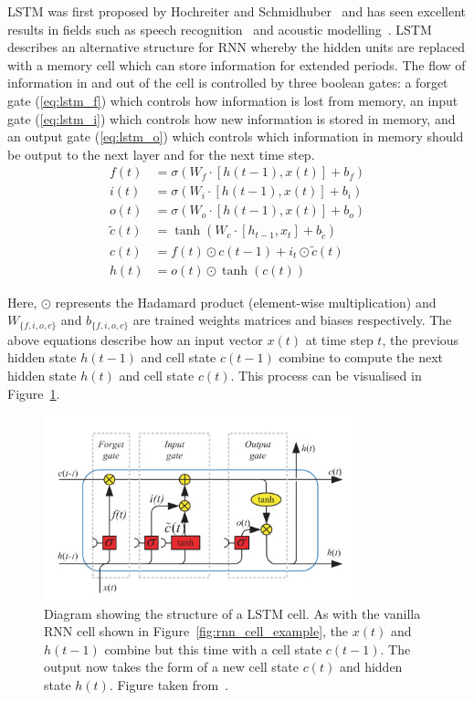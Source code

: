 LSTM was first proposed by Hochreiter and Schmidhuber~\cite{hochreiter1997long}
and has seen excellent results in fields such as speech
recognition~\cite{he2016exploiting} and acoustic
modelling~\cite{qu2017syllable}. LSTM describes an alternative structure for RNN
whereby the hidden units are replaced with a memory cell which can store
information for extended periods. The flow of information in and out of
the cell is controlled by three boolean gates: a forget gate (\ref{eq:lstm_f})
which controls how information is lost from memory, an
input gate (\ref{eq:lstm_i}) which controls how new information is stored in
memory, and an output gate (\ref{eq:lstm_o}) which controls which information in
memory should be output to the next layer and for the next time step.
\begin{align}
  f(t) &= \sigma(W_f \cdot \left[ h(t-1),x(t) \right] + b_f) \label{eq:lstm_f} \\[0.5em]
  i(t) &= \sigma(W_i \cdot \left[ h(t-1),x(t) \right] + b_i) \label{eq:lstm_i} \\[0.5em]
  o(t) &= \sigma(W_o \cdot \left[ h(t-1),x(t) \right] + b_o) \label{eq:lstm_o} \\[0.5em]
  \tilde{c}(t) &= \tanh \left( 
    W_c \cdot \left[ h_{t-1},x_t \right] + b_{\tilde{c}}
  \right)\\[0.5em]
  c(t) &= f(t) \odot c(t-1) + i_t \odot \tilde{c}(t) \\[0.5em]
  h(t) &= o(t) \odot \tanh (c(t))
\end{align}

Here, $\odot$ represents the Hadamard product (element-wise multiplication) and
$W_{\{f,i,o,c\}}$ and $b_{\{f,i,o,c\}}$ are trained weights matrices and biases
respectively. The above equations describe how an input vector $x(t)$ at time
step $t$, the previous hidden state $h(t-1)$ and cell state $c(t-1)$ combine to
compute the next hidden state $h(t)$ and cell state $c(t)$. This process can be
visualised in Figure~\ref{fig:lstm_cell_example}.

\begin{figure}[ht]
  \centering
  \includegraphics[width=0.8\textwidth]{figures/lstm_cell.png}
  \caption{Diagram showing the structure of a LSTM cell. As with the vanilla RNN
    cell shown in Figure~\ref{fig:rnn_cell_example}, the $x(t)$ and $h(t-1)$
    combine but this time with a cell state $c(t-1)$. The output now takes the
    form of a new cell state $c(t)$ and hidden state $h(t)$. Figure taken
  from~\cite{yu2019review}.}\label{fig:lstm_cell_example}
\end{figure}

